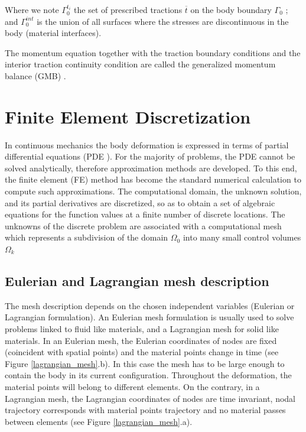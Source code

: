 Where we note $\Gamma_0^{t_i}$ the set of prescribed tractions  $\overline{t}$ on the body boundary $\Gamma_0$ ; and $\Gamma_0^{int}$ is the union of all surfaces where the stresses are discontinuous in the body (material interfaces).

The momentum equation together with the traction boundary conditions and the interior traction continuity condition are called the generalized momentum balance (GMB) .
\section{Finite Element Discretization}

\label{section:lagrangianmesh}
In continuous mechanics the body deformation is expressed in terms of partial differential equations (PDE ). For the majority of problems, the PDE cannot be solved analytically, therefore approximation methods are developed. To this end, the finite element (FE) method has become the standard numerical calculation to compute such approximations. The computational domain, the unknown solution, and its partial derivatives are discretized, so as to obtain a set of algebraic equations for the function values at a finite number of discrete locations. The unknowns of the discrete problem are
associated with a computational mesh which represents a subdivision of the domain $\Omega_0$ into many small control volumes $\Omega_k$

\subsection{Eulerian and Lagrangian mesh description}

The mesh description depends on the chosen independent variables (Eulerian or Lagrangian formulation). An Eulerian mesh formulation is usually used to solve problems linked to fluid like materials, and a Lagrangian mesh for solid like materials. In an Eulerian mesh, the Eulerian coordinates of nodes are fixed (coincident with spatial points) and the material points change in time (see Figure \ref{lagrangian_mesh}.b). In this case the mesh has to be large enough to contain the body in its current configuration. Throughout the deformation, the material points will belong to different elements. On the contrary, in a Lagrangian mesh, the Lagrangian coordinates of nodes are time invariant, nodal trajectory corresponds with material points trajectory and no material passes between elements (see Figure \ref{lagrangian_mesh}.a). 

